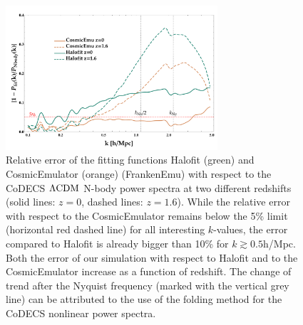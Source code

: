 \begin{figure}
\centering{}\includegraphics[width=0.7\textwidth]{Chapters/fitting-funcs/figures/emulatorHalofitNbodyPkErrors-v7}\protect\protect\caption[Relative error of the fitting
functions Halofit and CosmicEmulator
with respect to the CoDECS $\lcdm$ N-body power spectra.]{\label{fig:Error-comp-Halofit-CosmicEmu} Relative error of the fitting
functions Halofit (green) and CosmicEmulator (orange) (FrankenEmu)
with respect to the CoDECS $\protect\Lambda\mathrm{CDM}$ N-body power spectra at
two different redshifts (solid lines: $z=0$, dashed lines: $z=1.6$).
While the relative error with respect to the CosmicEmulator remains
below the 5\% limit (horizontal red dashed line) for all interesting
$k$-values, the error compared to Halofit is already bigger than
10\% for $k \gtrsim 0.5$h/Mpc. Both the error of our simulation with
respect to Halofit and to the CosmicEmulator increase as a function
of redshift. The change of trend after the Nyquist frequency (marked
with the vertical grey line) can be attributed to the use of the folding
method for the CoDECS nonlinear power spectra.}
\end{figure}



